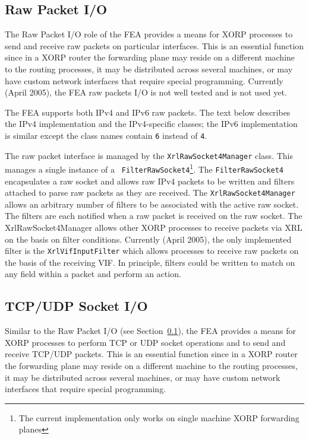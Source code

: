 \documentclass[11pt]{article}
\begin{document}
\subsection{Raw Packet I/O}
\label{sec:design:raw_packet_io}

The Raw Packet I/O role of the FEA provides a means for
XORP processes to send and receive raw packets on particular interfaces.
This is an essential function since in a XORP router the forwarding
plane may reside on a different machine to the routing processes, it
may be distributed across several machines, or may have custom network
interfaces that require special programming.  Currently (April 2005),
the FEA raw packets I/O is not well tested and is not used yet.

The FEA supports both IPv4 and IPv6 raw packets.
The text below describes the IPv4 implementation and the IPv4-specific
classes; the IPv6 implementation is similar except the class names
contain {\tt 6} instead of {\tt 4}.

The raw packet interface is managed by the {\tt XrlRawSocket4Manager}
class.  This manages a single instance of a {\tt
FilterRawSocket4}\footnote{The current implementation only works on
single machine XORP forwarding planes}.  The {\tt FilterRawSocket4}
encapsulates a raw socket and allows raw IPv4 packets to be written
and filters attached to parse raw packets as they are received.  The
{\tt XrlRawSocket4Manager} allows an arbitrary number of filters to be
associated with the active raw socket.  The filters are each notified
when a raw packet is received on the raw socket.  The
XrlRawSocket4Manager allows other XORP processes to receive packets
via XRL on the basis on filter conditions.  Currently (April 2005),
the only implemented filter is the {\tt XrlVifInputFilter} which
allows processes to receive raw packets on the basis of the receiving
VIF.  In principle, filters could be written to match on any field
within a packet and perform an action.

\subsection{TCP/UDP Socket I/O}

Similar to the Raw Packet I/O (see
Section~\ref{sec:design:raw_packet_io}), the FEA provides a means for
XORP processes to perform TCP or UDP socket operations and to send and
receive TCP/UDP packets.
This is an essential function since in a XORP router the forwarding
plane may reside on a different machine to the routing processes, it
may be distributed across several machines, or may have custom network
interfaces that require special programming.
\end{document}
